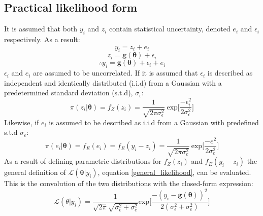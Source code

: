 \subsection{Practical likelihood form}
It is assumed that both $y_i$ and $z_i$ contain statistical uncertainty, denoted $e_i$ and $\epsilon_i$ respectively. As a result: 
\begin{equation}
y_i = z_i + e_i
\end{equation}
\begin{equation}
z_i = \bm{g}(\bm{\theta}) + \epsilon_i
\end{equation}	
\begin{equation}
\therefore	y_i = \bm{g}(\bm{\theta}) + \epsilon_i + e_i
\end{equation}
$\epsilon_i$ and $e_i$ are assumed to be uncorrelated. If it is assumed that $\epsilon_i$ is described as independent and identically distributed (i.i.d) from a Gaussian with a predetermined standard deviation (s.t.d), $\sigma_{\epsilon}$:
\begin{equation}
\pi(z_i|\bm{\theta}) = f_Z(z_i) = \frac{1}{\sqrt{2\pi\sigma_{\epsilon}^2}}\ \text{exp}\bigg[\frac{-\epsilon_i^2}{2\sigma_{\epsilon}^2} \bigg]
\end{equation} 
Likewise, if $e_i$ is assumed to be described as i.i.d from a Gaussian with predefined s.t.d $\sigma_{e}$:
\begin{equation}
\pi(e_i|\bm{\theta}) = f_E(e_i) = f_E(y_i-z_i) = \frac{1}{\sqrt{2\pi\sigma_{e}^2}}\ \text{exp}\bigg[\frac{-e^2}{2\sigma_{e}^2} \bigg]
\end{equation}
As a result of defining parametric distributions for $f_Z(z_i)$ and $f_E(y_i-z_i)$ the general definition of $\mathcal{L}(\bm{\theta}|y_i)$, equation \ref{general_likelihood}, can be evaluated. This is the convolution of the two distributions with the closed-form expression:
\begin{equation}
\mathcal{L}(\theta|y_i) = \frac{1}{\sqrt{2\pi}\sqrt{\sigma_{\epsilon}^2+\sigma_{e}^2}} \text{exp}\bigg[\frac{-(y_i-\bm{g}(\bm{\theta}))^2}{2(\sigma_{\epsilon}^2+\sigma_{e}^2)}\bigg]
\end{equation}


